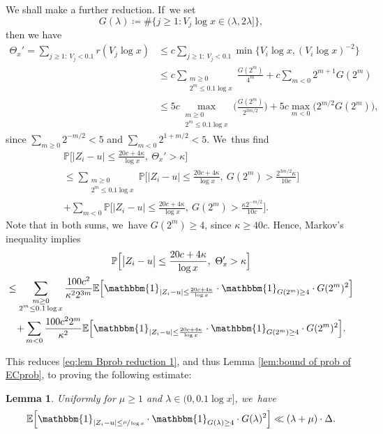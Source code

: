 \documentclass[10pt,a4paper]{article}
\newcommand{\PP}{\mathbb{P}}
\newcommand{\EE}{\mathbb{E}}
\newcommand{\one}{\mathbbm{1}}
\newcommand{\bg}{\big}
\newcommand{\bgg}{\Big}
\theoremstyle{plain}
\newtheorem{lem}[cor]{Lemma}
\theoremstyle{definition}
\begin{document}
We shall make a further reduction. If~we set
\[
G(\lambda)\coloneqq \#\bg\{j\ge1: V_j\log x\in (\lambda,2\lambda] \bg\},
\]
then we have
\[
\begin{split}
\Theta_x' =\sum_{j\ge1:\ V_j<0.1} r(V_j\log x)
&\le c\sum_{j\ge1:\ V_j<0.1}\min\bg\{V_i\log x,(V_i\log x)^{-2}\bg\} \\
&\le c\sum_{\substack{m\ge0 \\ 2^m\le 0.1\log x}} \frac{G(2^m)}{4^m} + c \sum_{m<0} 2^{m+1} G(2^m) \\
&\le 5c \max_{\substack{m\ge0 \\ 2^m\le 0.1\log x}} \bgg(\frac{G(2^m)}{2^{3m/2}} \bgg) + 5c \max_{m<0}\bg(2^{m/2} G(2^m)\bg),
\end{split}
\]
since $\sum_{m\ge0}2^{-m/2} <5$ and $\sum_{m<0}2^{1+m/2}< 5$. We~thus find
\begin{multline*}
\PP\bgg[ \bg| Z_i - u \bg|\le \frac{20c+4\kappa}{\log x},\ \Theta_x'>\kappa \bgg] \\
\le \sum_{\substack{m\ge0 \\ 2^m\le 0.1\log x}} \!\!\! \PP\bgg[ \bg| Z_i - u \bg|\le \frac{20c+4\kappa}{\log x},\ G(2^m)> \frac{2^{3m/2} \kappa}{10c} \bgg] \\
+\sum_{m<0} \PP\bgg[ \bg| Z_i - u \bg|\le \frac{20c+4\kappa}{\log x},\ G(2^m)> \frac{\kappa 2^{-m/2}}{10c} \bgg].
\end{multline*}
Note that in both sums, we~have $G(2^m)\ge 4$, since $\kappa\ge 40c$. Hence, Markov's inequality implies
\begin{multline*}
\PP\bgg[ \bg| Z_i - u \bg|\le \frac{20c+4\kappa}{\log x},\ \Theta_x'>\kappa \bgg] \\
\le \sum_{\substack{m\ge0 \\ 2^m\le 0.1\log x}} \frac{100c^2}{\kappa^22^{3m}}
\EE\bgg[ \one_{| Z_i - u |\le \frac{20c+4\kappa}{\log x} } \cdot \one_{G(2^m) \ge4} \cdot G(2^m)^2\bgg] \\
+\sum_{m<0} \frac{100c^22^m}{\kappa^2}
\EE\bgg[ \one_{| Z_i - u |\le \frac{20c+4\kappa}{\log x} }\cdot \one_{G(2^m) \ge4}\cdot G(2^m)^2\bgg].
\end{multline*}

This reduces \eqref{eq:lem Bprob reduction 1}, and thus Lemma \ref{lem:bound of prob of ECprob}, to proving the following estimate:

\begin{lem}
\label{lem:Bprob reduction 2} Uniformly for $\mu\ge1$ and $\lambda\in(0,0.1\log x]$, we~have
\[
\EE\bgg[ \one_{| Z_i - u |\le \sfrac{\mu}{\log x} } \cdot \one_{G(\lambda) \ge4} \cdot G(\lambda)^2 \bgg]
\ll (\lambda+\mu)\cdot \Delta.
\]
\end{lem}
\end{document}
